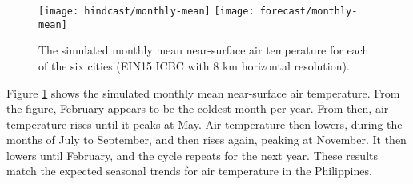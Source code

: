 		
	\begin{figure}	
		\centering
		\texttt{[image: hindcast/monthly-mean]}
		\texttt{[image: forecast/monthly-mean]}
		\caption{
			The simulated monthly mean near-surface air temperature for each of the six cities (EIN15 ICBC with 8 km horizontal resolution).
		}
		\label{fig:hindcast-monthly-mean}
	\end{figure}

	Figure \ref{fig:hindcast-monthly-mean} shows the simulated monthly mean near-surface air temperature.
	From the figure, February appears to be the coldest month per year.
	From then, air temperature rises until it peaks at May.
	Air temperature then lowers, during the months of July to September,
		and then rises again, peaking at November.
	It then lowers until February, and the cycle repeats for the next year.
	These results match the expected seasonal trends for air temperature in the Philippines.
	


